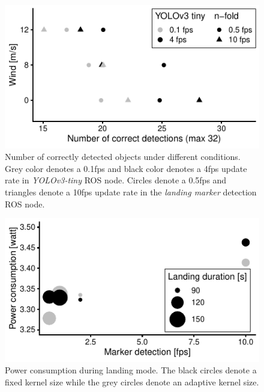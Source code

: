 \documentclass[conference]{IEEEtran}
\begin{document}
\begin{figure}[t]
  \centering
  \includegraphics{data_visualization/QoSDetection.pdf}
  \caption{Number of correctly detected objects
  under different conditions. 
  Grey color denotes a 0.1fps and black color denotes a 4fps 
  update rate in \emph{YOLOv3-tiny} ROS node. 
  Circles denote a 0.5fps and triangles denote a 10fps update 
  rate in the \emph{landing marker} detection ROS node.}
  \label{fig:NCorrectObjectDetections}
\end{figure}

\begin{figure}[t]
\centering
\includegraphics{data_visualization/PowerLanding.pdf}
\caption{Power consumption during landing mode. 
The black circles denote a fixed kernel size while the grey circles denote an adaptive kernel size.}
\label{fig:PowerDuringLanding}
\end{figure}
\end{document}

